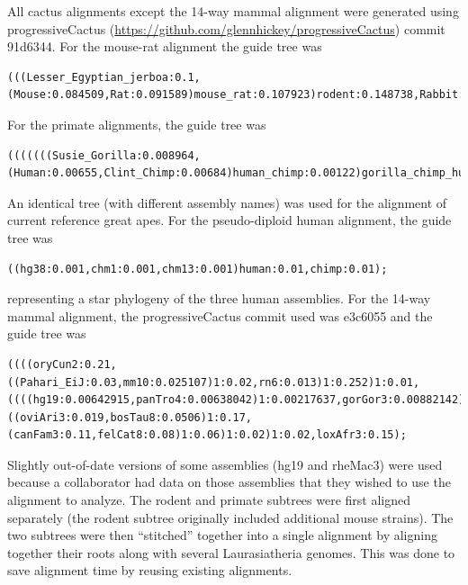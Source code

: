 \documentclass[fleqn,10pt]{wlscirep}
\begin{document}
All cactus alignments except the 14-way mammal alignment were generated using progressiveCactus (\url{https://github.com/glennhickey/progressiveCactus}) commit 91d6344. For the mouse-rat alignment the guide tree was 

\begin{lstlisting}
(((Lesser_Egyptian_jerboa:0.1,(Mouse:0.084509,Rat:0.091589)mouse_rat:0.107923)rodent:0.148738,Rabbit:0.21569)glires:0.015313,Human:0.143908);
\end{lstlisting}

For the primate alignments, the guide tree was 
    
\begin{lstlisting}
(((((((Susie_Gorilla:0.008964,(Human:0.00655,Clint_Chimp:0.00684)human_chimp:0.00122)gorilla_chimp_human:0.009693,Susie_Orangutan:0.01894)great_ape:0.003471,Gibbon:0.02227)great_ape_gibbon:0.01204,Rhesus:0.004991)old_world_monkey:0.02183,Squirrel_monkey:0.01035)monkey:0.05209,Bushbaby:0.1194)primate_anc:0.013494,Mouse:0.084509);
\end{lstlisting}
    
An identical tree (with different assembly names) was used for the alignment of current reference great apes. For the pseudo-diploid human alignment, the guide tree was 
    
\begin{lstlisting}
((hg38:0.001,chm1:0.001,chm13:0.001)human:0.01,chimp:0.01);
\end{lstlisting}
    
representing a star phylogeny of the three human assemblies. For the 14-way mammal alignment, the progressiveCactus commit used was e3c6055 and the guide tree was 
    
\begin{lstlisting}
((((oryCun2:0.21,((Pahari_EiJ:0.03,mm10:0.025107)1:0.02,rn6:0.013)1:0.252)1:0.01,((((hg19:0.00642915,panTro4:0.00638042)1:0.00217637,gorGor3:0.00882142)1:0.00935116,ponAbe2:0.0185056)1:0.00440069,rheMac3:0.007)1:0.1)1:0.02,((oviAri3:0.019,bosTau8:0.0506)1:0.17,(canFam3:0.11,felCat8:0.08)1:0.06)1:0.02)1:0.02,loxAfr3:0.15);
\end{lstlisting}
    
    
Slightly out-of-date versions of some assemblies (hg19 and rheMac3) were used because a collaborator had data on those assemblies that they wished to use the alignment to analyze. The rodent and primate subtrees were first aligned separately (the rodent subtree originally included additional mouse strains). The two subtrees were then “stitched” together into a single alignment by aligning together their roots along with several Laurasiatheria genomes. This was done to save alignment time by reusing existing alignments.
\end{document}
